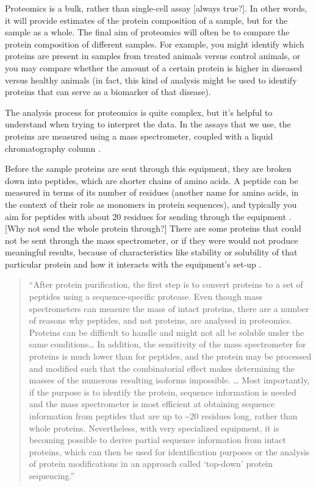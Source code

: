 \documentclass[
]{book}
\begin{document}
Proteomics is a bulk, rather than single-cell assay {[}always true?{]}. In other
words, it will provide estimates of the protein composition of a sample, but for
the sample as a whole. The final aim of proteomics will often be to compare
the protein composition of different samples. For example, you might
identify which proteins are present in samples from treated animals versus
control animals, or you may compare whether the amount of a certain
protein is higher in diseased versus healthy animals (in fact, this kind
of analysis might be used to identify proteins that can serve as a
biomarker of that disease).

The analysis process for proteomics is quite complex, but it's helpful
to understand when trying to interpret the data. In the assays that we
use, the proteins are measured using a mass spectrometer, coupled with
a liquid chromatography column \citep{steen2004abc}.

Before the sample proteins are sent through this equipment, they are broken down
into peptides, which are shorter chains of amino acids. A peptide can be
measured in terms of its number of residues (another name for amino acids, in
the context of their role as monomers in protein sequences), and typically you
aim for peptides with about 20 residues for sending through the equipment
\citep{steen2004abc}. {[}Why not send the whole protein through?{]} There are some
proteins that could not be sent through the mass spectrometer, or if they were
would not produce meaningful results, because of characteristics like stability
or solubility of that particular protein and how it interacts with the
equipment's set-up \citep{steen2004abc}.

\begin{quote}
``After protein purification, the first step is to convert proteins to a set of
peptides using a sequence-specific protease. Even though mass spectrometers can
measure the mass of intact proteins, there are a number of reasons why peptides,
and not proteins, are analysed in proteomics. Proteins can be difficult to
handle and might not all be soluble under the same conditions\ldots{} In addition,
the sensitivity of the mass spectrometer for proteins is much lower than for
peptides, and the protein may be processed and modified such that the
combinatorial effect makes determining the masses of the numerous resulting
isoforms impossible. \ldots{} Most importantly, if the purpose is to identify the
protein, sequence information is needed and the mass spectrometer is most
efficient at obtaining sequence information from peptides that are up to \textasciitilde20
residues long, rather than whole proteins. Nevertheless, with very specialized
equipment, it is becoming possible to derive partial sequence information from
intact proteins, which can then be used for identification purposes or the
analysis of protein modifications in an approach called `top-down' protein
sequencing.'' \citep{steen2004abc}
\end{quote}
\end{document}

